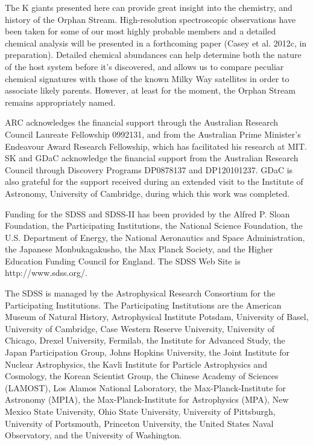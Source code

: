 \documentclass{emulateapj}
\begin{document}
The K giants presented here can provide great insight into the chemistry, and history of the Orphan Stream. High-resolution spectroscopic observations have been taken for some of our most highly probable members and a detailed chemical analysis will be presented in a forthcoming paper (Casey et al. 2012c, in preparation). Detailed chemical abundances can help determine both the nature of the host system before it's discovered, and allows us to compare peculiar chemical signatures with those of the known Milky Way satellites in order to associate likely parents. However, at least for the moment, the Orphan Stream remains appropriately named.


\acknowledgements
ARC acknowledges the financial support through the Australian Research Council Laureate Fellowship 0992131, and from the Australian Prime Minister's Endeavour Award Research Fellowship, which has facilitated his research at MIT. SK and GDaC acknowledge the financial support from the Australian Research Council through Discovery Programs DP0878137 and DP120101237. GDaC is also grateful for the support received during an extended visit to the Institute of Astronomy, University of Cambridge, during which this work was completed.

Funding for the SDSS and SDSS-II has been provided by the Alfred P. Sloan Foundation, the Participating Institutions, the National Science Foundation, the U.S. Department of Energy, the National Aeronautics and Space Administration, the Japanese Monbukagakusho, the Max Planck Society, and the Higher Education Funding Council for England. The SDSS Web Site is http://www.sdss.org/.

The SDSS is managed by the Astrophysical Research Consortium for the Participating Institutions. The Participating Institutions are the American Museum of Natural History, Astrophysical Institute Potsdam, University of Basel, University of Cambridge, Case Western Reserve University, University of Chicago, Drexel University, Fermilab, the Institute for Advanced Study, the Japan Participation Group, Johns Hopkins University, the Joint Institute for Nuclear Astrophysics, the Kavli Institute for Particle Astrophysics and Cosmology, the Korean Scientist Group, the Chinese Academy of Sciences (LAMOST), Los Alamos National Laboratory, the Max-Planck-Institute for Astronomy (MPIA), the Max-Planck-Institute for Astrophysics (MPA), New Mexico State University, Ohio State University, University of Pittsburgh, University of Portsmouth, Princeton University, the United States Naval Observatory, and the University of Washington.

\phn



\end{document}
